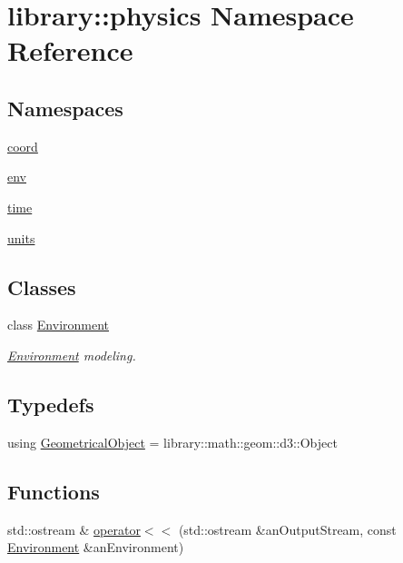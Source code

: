 \hypertarget{namespacelibrary_1_1physics}{}\section{library\+:\+:physics Namespace Reference}
\label{namespacelibrary_1_1physics}
\subsection*{Namespaces}
\begin{DoxyCompactItemize}
\item 
 \hyperlink{namespacelibrary_1_1physics_1_1coord}{coord}
\item 
 \hyperlink{namespacelibrary_1_1physics_1_1env}{env}
\item 
 \hyperlink{namespacelibrary_1_1physics_1_1time}{time}
\item 
 \hyperlink{namespacelibrary_1_1physics_1_1units}{units}
\end{DoxyCompactItemize}
\subsection*{Classes}
\begin{DoxyCompactItemize}
\item 
class \hyperlink{classlibrary_1_1physics_1_1_environment}{Environment}
\begin{DoxyCompactList}\small\item\em \hyperlink{classlibrary_1_1physics_1_1_environment}{Environment} modeling. \end{DoxyCompactList}\end{DoxyCompactItemize}
\subsection*{Typedefs}
\begin{DoxyCompactItemize}
\item 
using \hyperlink{namespacelibrary_1_1physics_a188a48c84b083aea628a2bd98f6b8e0a}{Geometrical\+Object} = library\+::math\+::geom\+::d3\+::\+Object
\end{DoxyCompactItemize}
\subsection*{Functions}
\begin{DoxyCompactItemize}
\item 
std\+::ostream \& \hyperlink{namespacelibrary_1_1physics_a3786f2dadc91182f9f027bf75bb186ce}{operator$<$$<$} (std\+::ostream \&an\+Output\+Stream, const \hyperlink{classlibrary_1_1physics_1_1_environment}{Environment} \&an\+Environment)
\end{DoxyCompactItemize}


